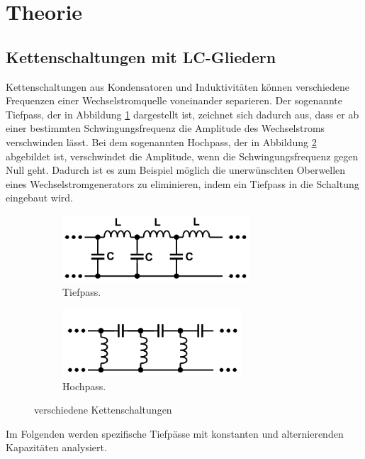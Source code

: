 \section{Theorie}
\label{sec:Theorie}

\subsection{Kettenschaltungen mit LC-Gliedern}

Kettenschaltungen aus Kondensatoren und Induktivitäten können verschiedene
Frequenzen einer Wechselstromquelle voneinander separieren.
Der sogenannte Tiefpass, der in Abbildung \ref{subfig:Tiefpass}
dargestellt ist, zeichnet
sich dadurch aus, dass er ab einer bestimmten Schwingungsfrequenz die Amplitude
des Wechselstroms verschwinden lässt.
Bei dem sogenannten Hochpass, der in Abbildung \ref{subfig:Hochpass}
abgebildet ist, verschwindet
die Amplitude, wenn die Schwingungsfrequenz gegen Null geht.
Dadurch ist es zum Beispiel möglich die unerwünschten Oberwellen eines
Wechselstromgenerators zu eliminieren, indem ein Tiefpass in die
Schaltung eingebaut wird.

\begin{figure}
  \centering
  \begin{subfigure}{0.48\textwidth}
    \centering
    \includegraphics[height=2.5cm]{Tiefpass.png}
    \caption{Tiefpass.}
    \label{subfig:Tiefpass}
  \end{subfigure}
  \begin{subfigure}{0.48\textwidth}
    \centering
    \includegraphics[height=2.5cm]{Hochpass.png}
    \caption{Hochpass.}
    \label{subfig:Hochpass}
  \end{subfigure}
  \caption{verschiedene Kettenschaltungen}
  \label{fig:Ketten}
\end{figure}

Im Folgenden werden spezifische Tiefpässe mit konstanten und
alternierenden Kapazitäten analysiert.


